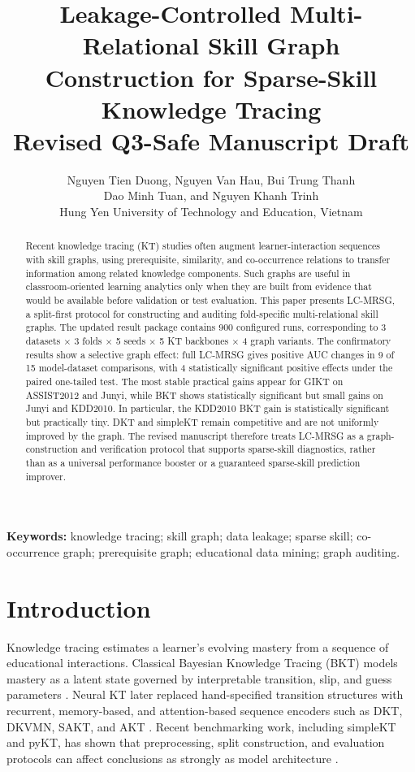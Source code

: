 \documentclass[11pt,a4paper]{article}
\title{Leakage-Controlled Multi-Relational Skill Graph Construction for Sparse-Skill Knowledge Tracing\\\large Revised Q3-Safe Manuscript Draft}
\author{Nguyen Tien Duong, Nguyen Van Hau, Bui Trung Thanh\\
Dao Minh Tuan, and Nguyen Khanh Trinh\\
Hung Yen University of Technology and Education, Vietnam}
\date{}
\newcommand{\LCMRSG}{LC-MRSG}
\begin{document}
\maketitle

\begin{abstract}
Recent knowledge tracing (KT) studies often augment learner-interaction sequences with skill graphs, using prerequisite, similarity, and co-occurrence relations to transfer information among related knowledge components. Such graphs are useful in classroom-oriented learning analytics only when they are built from evidence that would be available before validation or test evaluation. This paper presents \LCMRSG{}, a split-first protocol for constructing and auditing fold-specific multi-relational skill graphs. The updated result package contains 900 configured runs, corresponding to 3 datasets $\times$ 3 folds $\times$ 5 seeds $\times$ 5 KT backbones $\times$ 4 graph variants. The confirmatory results show a selective graph effect: full \LCMRSG{} gives positive AUC changes in 9 of 15 model-dataset comparisons, with 4 statistically significant positive effects under the paired one-tailed test. The most stable practical gains appear for GIKT on ASSIST2012 and Junyi, while BKT shows statistically significant but small gains on Junyi and KDD2010. In particular, the KDD2010 BKT gain is statistically significant but practically tiny. DKT and simpleKT remain competitive and are not uniformly improved by the graph. The revised manuscript therefore treats \LCMRSG{} as a graph-construction and verification protocol that supports sparse-skill diagnostics, rather than as a universal performance booster or a guaranteed sparse-skill prediction improver.
\end{abstract}

\noindent\textbf{Keywords:} knowledge tracing; skill graph; data leakage; sparse skill; co-occurrence graph; prerequisite graph; educational data mining; graph auditing.

\section{Introduction}
Knowledge tracing estimates a learner's evolving mastery from a sequence of educational interactions. Classical Bayesian Knowledge Tracing (BKT) models mastery as a latent state governed by interpretable transition, slip, and guess parameters \cite{corbett1994,baker2008}. Neural KT later replaced hand-specified transition structures with recurrent, memory-based, and attention-based sequence encoders such as DKT, DKVMN, SAKT, and AKT \cite{piech2015,zhang2017,pandey2019,ghosh2020}. Recent benchmarking work, including simpleKT and pyKT, has shown that preprocessing, split construction, and evaluation protocols can affect conclusions as strongly as model architecture \cite{liu2023simplekt,liu2022pykt}.
\end{document}
